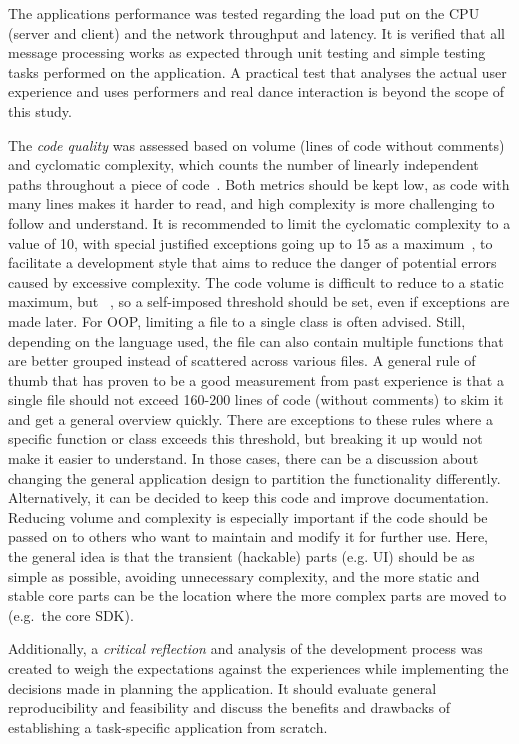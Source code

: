The application\textquotesingle s performance was tested regarding the load put on the \ac{CPU} (server and client) and the network throughput and latency.
It is verified that all message processing works as expected through unit testing and simple testing tasks performed on the application.
A practical test that analyses the actual user experience and uses performers and real dance interaction is beyond the scope of this study.

The \emph{code quality} was assessed based on volume (lines of code without comments) and cyclomatic complexity, which counts the number of linearly independent paths throughout a piece of code~\parencite[see][]{mcCabeComplexity}.
Both metrics should be kept low, as code with many lines makes it harder to read, and high complexity is more challenging to follow and understand.
It is recommended to limit the cyclomatic complexity to a value of 10, with special justified exceptions going up to 15 as a maximum~\parencite[15]{testingCyclomaticComplexity}, to facilitate a development style that aims to reduce the danger of potential errors caused by excessive complexity.
The code volume is difficult to reduce to a static maximum, but ~\parencite[6]{softwareMetricsReliability}, so a self-imposed threshold should be set, even if exceptions are made later.
For \ac{OOP}, limiting a file to a single class is often advised.
Still, depending on the language used, the file can also contain multiple functions that are better grouped instead of scattered across various files.
A general rule of thumb that has proven to be a good measurement from past experience is that a single file should not exceed 160-200 lines of code (without comments) to skim it and get a general overview quickly.
There are exceptions to these rules where a specific function or class exceeds this threshold, but breaking it up would not make it easier to understand.
In those cases, there can be a discussion about changing the general application design to partition the functionality differently.
Alternatively, it can be decided to keep this code and improve documentation.
Reducing volume and complexity is especially important if the code should be passed on to others who want to maintain and modify it for further use.
Here, the general idea is that the transient (hackable) parts (e.g. \ac{UI}) should be as simple as possible, avoiding unnecessary complexity, and the more static and stable core parts can be the location where the more complex parts are moved to (e.g.\ the core \ac{SDK}).

Additionally, a \emph{critical reflection} and analysis of the development process was created to weigh the expectations against the experiences while implementing the decisions made in planning the application.
It should evaluate general reproducibility and feasibility and discuss the benefits and drawbacks of establishing a task-specific application from scratch.
